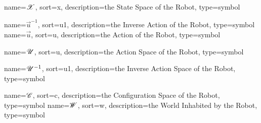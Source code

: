 	{%
		name=\ensuremath{\vecspace{X}},
		sort=x,
		description=the State Space of the Robot,
		type=symbol
	}
	\newcommand{\statespace}{\gls{sym:statespace}}

	\newcommand{\phasespace}{\statespace}

	{%
		name=\ensuremath{\vec{u}^{-1}},
		sort=u1,
		description=the Inverse Action  of the Robot,
		type=symbol
	}
	\newcommand{\invaction}{\gls{sym:invaction}}
	{%
		name=\ensuremath{\vec{u}},
		sort=u,
		description=the Action  of the Robot,
		type=symbol
	}
	\newcommand{\action}{\gls{sym:action}}

	{%
		name=\ensuremath{\vecspace{U}},
		sort=u,
		description=the Action Space of the Robot,
		type=symbol
	}
	\newcommand{\actionspace}{\gls{sym:actionspace}}

	{%
		name=\ensuremath{\vecspace{U}^{-1}},
		sort=u1,
		description=the Inverse Action Space of the Robot,
		type=symbol
	}
	\newcommand{\invactionspace}{\gls{sym:invactionspace}}

	{%
		name=\ensuremath{\vecspace{C}},
		sort=c,
		description=the Configuration Space of the Robot,
		type=symbol
	}
	\newcommand{\configurationspace}{\gls{sym:configurationspace}}
	{%
		name=\ensuremath{\vecspace{W}},
		sort=w,
		description=the World Inhabited by the Robot,
		type=symbol
	}
	\newcommand{\world}{\gls{sym:worldspace}}

